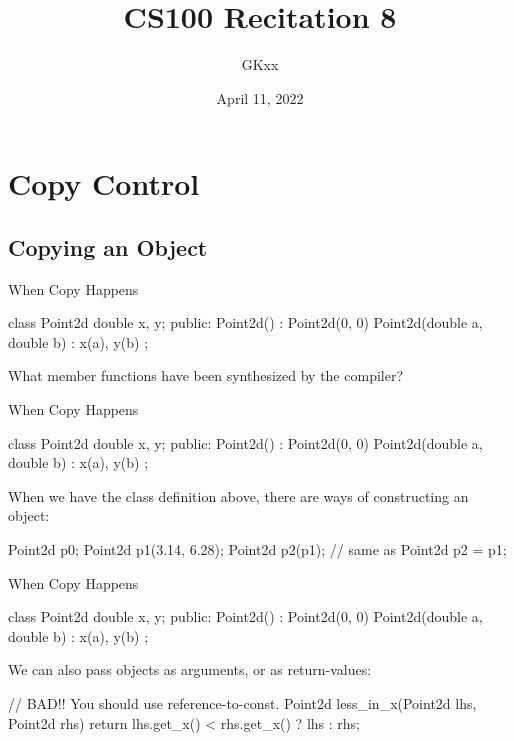 \documentclass{beamer}
\title{CS100 Recitation 8}
\author{GKxx}
\date{April 11, 2022}
\begin{document}
\begin{frame}
    \maketitle
\end{frame}

\section{Copy Control}

\subsection{Copying an Object}

\begin{frame}[fragile]{When Copy Happens}
    \begin{cpp}
class Point2d {
  double x, y;
 public:
  Point2d() : Point2d(0, 0) {}
  Point2d(double a, double b) : x(a), y(b) {}
};
    \end{cpp}
    \begin{question}
        What member functions have been synthesized by the compiler?
    \end{question}
\end{frame}

\begin{frame}[fragile]{When Copy Happens}
    \begin{cpp}
class Point2d {
  double x, y;
 public:
  Point2d() : Point2d(0, 0) {}
  Point2d(double a, double b) : x(a), y(b) {}
};
    \end{cpp}
    When we have the class definition above, there are  ways of constructing an object:
    \begin{cpp}
Point2d p0;
Point2d p1(3.14, 6.28);
Point2d p2(p1); // same as Point2d p2 = p1;
    \end{cpp}
\end{frame}

\begin{frame}[fragile]{When Copy Happens}
    \begin{cpp}
class Point2d {
  double x, y;
 public:
  Point2d() : Point2d(0, 0) {}
  Point2d(double a, double b) : x(a), y(b) {}
};
    \end{cpp}
    We can also pass  objects as arguments, or as return-values:
    \begin{cpp}
// BAD!! You should use reference-to-const.
Point2d less_in_x(Point2d lhs, Point2d rhs) {
  return lhs.get_x() < rhs.get_x() ? lhs : rhs;
}
    \end{cpp}
\end{frame}
\end{document}
